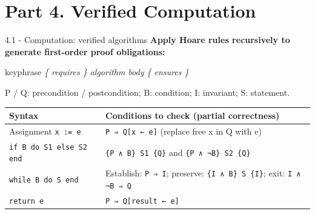 \documentclass[aspectratio=169,11pt]{beamer}
\begin{document}
\section{Part 4. Verified Computation}
\begin{frame}[fragile,t]{4.1 - Computation: verified algorithms}
\textcolor{blue!55!black}{\textbf{Apply Hoare rules recursively to generate first-order proof obligations:}}

\begin{center}
\begin{beamercolorbox}[rounded=true,sep=2.5mm,wd=0.9\textwidth]{keyphrase}
\centering\itshape \{ requires \}  algorithm body  \{ ensures \}
\end{beamercolorbox}
\end{center}
P / Q: precondition / postcondition; B: condition; I: invariant; S: statement.

\par{}
\begin{footnotesize}
\setlength{\tabcolsep}{3pt}
\renewcommand{\arraystretch}{1.15}
\begin{tabularx}{\textwidth}{l>{\raggedright\arraybackslash}X}
\toprule
\textbf{Syntax} & \textbf{Conditions to check (partial correctness)\footnotemark[1]} \\
\midrule
Assignment \texttt{x := e} & \texttt{P ⇒ Q[x ← e]} (replace free x in Q with e) \\
\texttt{if B do S1 else S2 end} & \texttt{\{P ∧ B\} S1 \{Q\}} and \texttt{\{P ∧ ¬B\} S2 \{Q\}} \\
\texttt{while B do S end} & Establish: \texttt{P ⇒ I}; preserve: \texttt{\{I ∧ B\} S \{I\}}; exit: \texttt{I ∧ ¬B ⇒ Q} \\
\texttt{return e} & \texttt{P ⇒ Q[result ← e]} \\
\bottomrule
\end{tabularx}
\end{footnotesize}


\end{frame}
\end{document}
